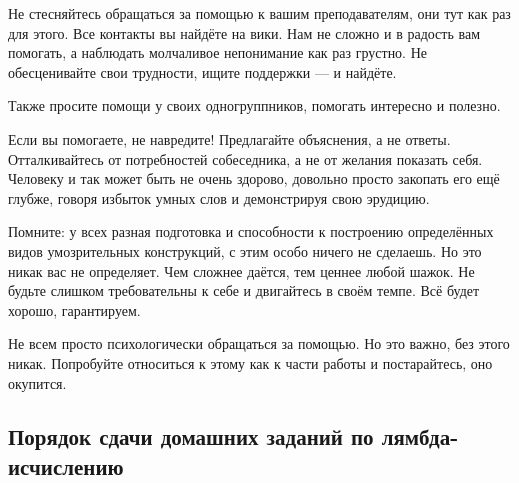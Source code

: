 \documentclass{article}
\begin{document}
    Не стесняйтесь обращаться за помощью к вашим преподавателям, они тут как раз для этого.
    Все контакты вы найдёте на вики.
    Нам не сложно и в радость вам помогать, а наблюдать молчаливое непонимание как раз грустно.
    Не обесценивайте свои трудности, ищите поддержки --- и найдёте.

    Также просите помощи у своих одногруппников, помогать интересно и полезно.

    Если вы помогаете, не навредите!
    Предлагайте объяснения, а не ответы.
    Отталкивайтесь от потребностей собеседника, а не от желания показать себя.
    Человеку и так может быть не очень здорово, довольно просто закопать его ещё глубже, говоря избыток умных слов и демонстрируя свою эрудицию.

    Помните: у всех разная подготовка и способности к построению определённых видов умозрительных конструкций, с этим особо ничего не сделаешь.
    Но это никак вас не определяет.
    Чем сложнее даётся, тем ценнее любой шажок.
    Не будьте слишком требовательны к себе и двигайтесь в своём темпе.
    Всё будет хорошо, гарантируем.

    Не всем просто психологически обращаться за помощью.
    Но это важно, без этого никак.
    Попробуйте относиться к этому как к части работы и постарайтесь, оно окупится.

    \subsection*{Порядок сдачи домашних заданий по лямбда-исчислению}
\end{document}
